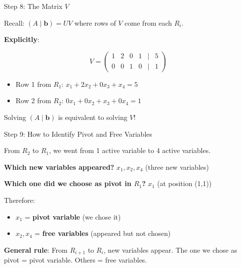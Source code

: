 \documentclass[10pt]{beamer}
\theoremstyle{definition}
\newcommand{\x}[1]{\alert{\textbf{#1}}}
\begin{document}
\begin{frame}{Step 8: The Matrix $V$}

Recall: $(A \mid \mathbf{b}) = UV$ where rows of $V$ come from each $R_i$.

\vspace{0.5em}

\x{Explicitly}:

$$V = \begin{pmatrix}
1 & 2 & 0 & 1 & | & 5 \\
0 & 0 & 1 & 0 & | & 1
\end{pmatrix}$$

\vspace{0.5em}

\begin{itemize}
\item Row 1 from $R_1$: $x_1 + 2x_2 + 0x_3 + x_4 = 5$
\item Row 2 from $R_2$: $0x_1 + 0x_2 + x_3 + 0x_4 = 1$
\end{itemize}

\vspace{0.5em}

Solving $(A \mid \mathbf{b})$ is equivalent to solving $V$!

\end{frame}

\begin{frame}{Step 9: How to Identify Pivot and Free Variables}

From $R_2$ to $R_1$, we went from 1 active variable to 4 active variables.

\vspace{0.5em}

\x{Which new variables appeared?} $x_1, x_2, x_4$ (three new variables)

\vspace{0.5em}

\x{Which one did we choose as pivot in $R_1$?} $x_1$ (at position (1,1))

\vspace{0.5em}

Therefore:
\begin{itemize}
\item $x_1$ = \x{pivot variable} (we chose it)
\item $x_2, x_4$ = \x{free variables} (appeared but not chosen)
\end{itemize}

\vspace{1em}

\x{General rule}: From $R_{i+1}$ to $R_i$, new variables appear. The one we chose as pivot = pivot variable. Others = free variables.

\end{frame}
\end{document}
